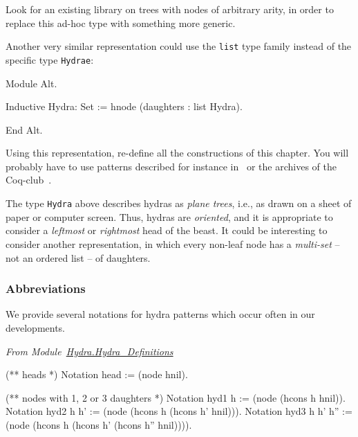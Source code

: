
\begin{project}
Look for an existing library on trees with nodes of arbitrary arity, in order to replace  this ad-hoc type with something more generic.
\end{project}



\begin{project}

 Another very similar representation could use the \texttt{list} type family instead of the specific 
type \texttt{Hydrae}:


\begin{Coqalt}
Module Alt.

Inductive Hydra: Set :=
  hnode (daughters : list Hydra).

End Alt.
\end{Coqalt}

Using this representation, re-define all the constructions of this chapter.
You will probably have to use patterns described for instance in~\cite{BC04} or the archives of the Coq-club~\cite{Coq}.

  
\end{project}



\begin{project}
The type \texttt{Hydra} above describes hydras as \emph{plane trees}, i.e., as drawn on a sheet of paper or computer screen. Thus, hydras are \emph{oriented},
and it is appropriate to consider a \emph{leftmost} or \emph{rightmost} head of
the beast. It could be interesting to consider another representation, in which
every non-leaf node has a \emph{multi-set} -- not an ordered list -- of daughters.
\end{project}

\subsubsection{Abbreviations}

We provide several notations for hydra patterns  which occur often in our developments. 

\vspace{4pt}
\noindent
\emph{From Module~\href{../theories/html/hydras.Hydra.Hydra_Definitions.html\#head}{Hydra.Hydra\_Definitions}}

\begin{Coqsrc}
(** heads *)
Notation head := (node hnil).
 
(** nodes  with 1, 2 or 3 daughters *)
Notation hyd1 h := (node (hcons h hnil)).
Notation hyd2 h h' := (node (hcons h (hcons h' hnil))).
Notation hyd3 h h' h'' := 
                   (node (hcons h (hcons h' (hcons h'' hnil)))).
\end{Coqsrc}



